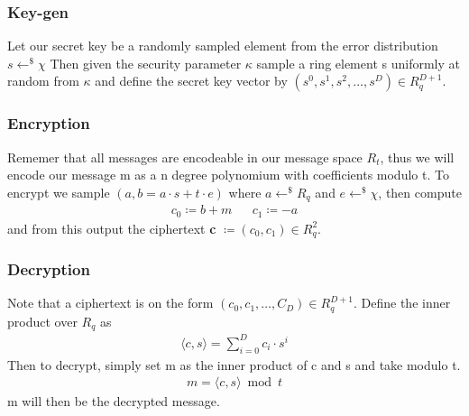 \documentclass[../main.tex]{subfiles}
\begin{document}
\subsubsection{Key-gen}
Let our secret key be a randomly sampled element from the error distribution $s \leftarrow^\$ \chi$
Then given the security parameter $\kappa$ sample a ring element s uniformly at random from $\kappa$ and define the
secret key vector by $(s^0, s^1, s^2, \dots, s^D) \in R_q^{D+1}$.

\subsubsection{Encryption}
Rememer that all messages are encodeable in our message space $R_t$, thus we will encode our message m as a n degree
polynomium with coefficients modulo t.
To encrypt we sample $(a, b = a \cdot s + t \cdot e)$ where $a \leftarrow^\$ R_q$ and $e \leftarrow^\$ \chi$,
then compute
\begin{align*}
    c_0 \coloneqq b + m &  & c_1 \coloneqq -a
\end{align*}
and from this output the ciphertext \textbf{c} $\coloneqq (c_0, c_1) \in R_q^2$.

\subsubsection{Decryption}
Note that a ciphertext is on the form $(c_0, c_1, \dots , C_{D}) \in R_q^{D+1}$.
Define the inner product over $R_q$ as
\begin{align*}
    \langle c, s \rangle = \sum_{i=0}^{D} c_i \cdot s^i
\end{align*}
Then to decrypt, simply set m as the inner product of c and s and take modulo t.
\begin{align*}
    m = \langle c, s \rangle \bmod t
\end{align*}
m will then be the decrypted message.
\end{document}
